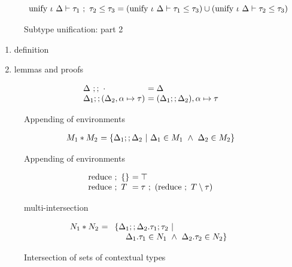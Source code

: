 \documentclass[sigplan,screen]{acmart}
\begin{document}
\begin{figure*}[h]
\[\begin{array}{l @{} l}
      \\
      \text{unify } \iota\ \Delta \vdash
      \tau_1\ ;\ \tau_2 \leq \tau_3
      &{} = 
      (\text{unify } \iota\ \Delta \vdash \tau_1 \leq \tau_3)
      \cup
      (\text{unify } \iota\ \Delta \vdash \tau_2 \leq \tau_3)

    \end{array}
  \]
  \caption{Subtype unification: part 2}
\end{figure*}
\begin{enumerate}
  \item definition 
  \item lemmas and proofs 
\end{enumerate}

\begin{figure}[h]
  \[
    \begin{array}{l @{} l}
    \Delta\ ;;\ \cdot
    &\ = \Delta 
    \\
    \Delta_1;;(\Delta_2,\alpha \mapsto \tau) 
    &\ = (\Delta_1;;\Delta_2),\alpha \mapsto \tau
    \end{array}
  \]

  \caption{Appending of environments}
\end{figure}

\begin{figure}[h]
  \[
    \begin{array}{l @{} l}
    M_1 * M_2 
    &\ = 
    \{ \Delta_1 ;; \Delta_2 \ |\ 
      \Delta_1 \in M_1
      \ \wedge\ 
      \Delta_2 \in M_2
    \}
    \end{array}
  \]

  \caption{Appending of environments}
\end{figure}

\begin{figure}[h]
  \[
    \begin{array}{l @{} l}
    \text{reduce } ;\ \{ \} 
    &\ = \top
    \\
    \text{reduce } ;\ T
    &\ = \tau\ ;\ (\text{reduce } ;\ T \setminus \tau)
    \end{array}
  \]

  \caption{multi-intersection}
\end{figure}

\begin{figure}[h]
  \[
    \begin{array}{l @{} l}
      N_1 * N_2
      &\ = 
      \begin{array}[t]{l}
        \{ \Delta_1 ;; \Delta_2 . \tau_1;\tau_2 \ |\ 
          \\
          \ \ \ \ \Delta_1.\tau_1 \in N_1
          \ \wedge\ 
          \Delta_2.\tau_2 \in N_2
        \}
      \end{array}
    \end{array}
  \]

  \caption{Intersection of sets of contextual types}
\end{figure}
\end{document}

